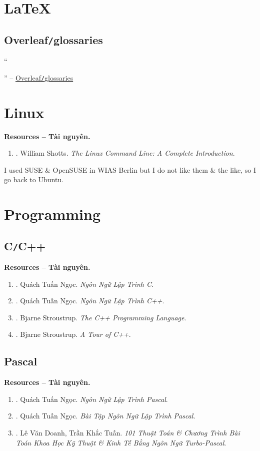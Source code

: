 \documentclass{article}
\begin{document}
\section{\LaTeX}

\subsection{Overleaf{\tt/}glossaries}
``


'' -- \href{https://www.overleaf.com/learn/latex/Glossaries}{Overleaf{\tt/}glossaries}


\section{Linux}
\textbf{\textsf{Resources -- Tài nguyên.}}
\begin{enumerate}
	\item \cite{Shotts2019}. {\sc William Shotts}. {\it The Linux Command Line: A Complete Introduction}.
\end{enumerate}
I used SUSE \& OpenSUSE in WIAS Berlin but I do not like them \& the like, so I go back to Ubuntu.


\section{Programming}

\subsection{C{\tt/}C++}
\textbf{\textsf{Resources -- Tài nguyên.}}
\begin{enumerate}
	\item \cite{Ngoc_C}. {\sc Quách Tuấn Ngọc}. {\it Ngôn Ngữ Lập Trình C}.
	\item \cite{Ngoc_C++}. {\sc Quách Tuấn Ngọc}. {\it Ngôn Ngữ Lập Trình C++}.
	\item \cite{Stroustrup2013}. {\sc Bjarne Stroustrup}. {\it The C++ Programming Language}.
	\item \cite{Stroustrup2018}. {\sc Bjarne Stroustrup}. {\it A Tour of C++}.
\end{enumerate}

\subsection{Pascal}
\textbf{\textsf{Resources -- Tài nguyên.}}
\begin{enumerate}
	\item \cite{Ngoc_Pascal}. {\sc Quách Tuấn Ngọc}. {\it Ngôn Ngữ Lập Trình Pascal}.
	\item \cite{Ngoc_BT_Pascal}. {\sc Quách Tuấn Ngọc}. {\it Bài Tập Ngôn Ngữ Lập Trình Pascal}.
	\item \cite{Doanh_Tuan_Pascal}. {\sc Lê Văn Doanh, Trần Khắc Tuấn}. {\it101 Thuật Toán \& Chương Trình Bài Toán Khoa Học Kỹ Thuật \& Kinh Tế Bằng Ngôn Ngữ Turbo-Pascal}.
\end{enumerate}
\end{document}
